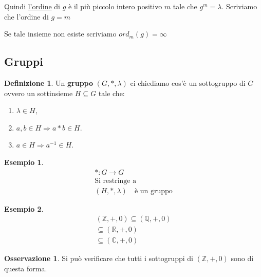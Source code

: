 \documentclass{article}
\newtheorem{exmp}{Esempio}[section]
\theoremstyle{definition}
\newtheorem{definition}{Definizione}[section]
\newtheorem{oss}{Osservazione}[section]
\begin{document}
Quindi \underline{l'ordine} di $g$ è il più piccolo intero positivo $m$ tale che $ g^m = \lambda $.
Scriviamo che l'ordine di $g = m$ \par
Se tale insieme non esiste scriviamo $ ord_m(g) = \infty$



\newpage
\subsection{Gruppi}\label{sec:gruppi}
\begin{definition}
       Un \textbf{gruppo} $ (G, *, \lambda) $ ci chiediamo cos'è un sottogruppo di $ G $ ovvero un sottinsieme $ H \subseteq G $ tale che:
       \begin{enumerate}
               \item $ \lambda \in H $,
               \item $ a,b \in H \Rightarrow a*b \in H $.
               \item $ a \in H \Rightarrow a^{-1} \in H $.
       \end{enumerate}
\end{definition}

\begin{exmp}
        \begin{align*}
                * : G \to G \\
                \mbox{Si restringe a} \\
                (H, *, \lambda) \quad \mbox{è un gruppo}
        \end{align*}
\end{exmp}
\begin{exmp}
        \begin{align*}
                (\mathbb{Z}, +, 0) \subseteq (\mathbb{Q}, +, 0) \\
                \subseteq (\mathbb{R}, +, 0) \\
                \subseteq (\mathbb{C}, +, 0)
        \end{align*}
\end{exmp}


\begin{tcolorbox}
\begin{oss}
       Si può verificare che tutti i sottogruppi di $ (\mathbb{Z}, +, 0) $ sono di questa forma. 
\end{oss}
\end{tcolorbox}
\end{document}
